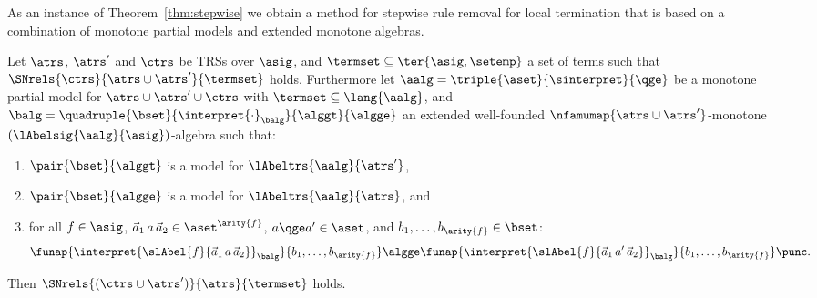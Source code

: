 As an instance of Theorem~\ref{thm:stepwise}
we obtain a method for stepwise rule removal for local termination that is based
on a combination of monotone partial models 
and extended monotone algebras.

\begin{theorem}\label{thm:quasicomb}
  Let $\atrs$, $\atrs'$ and $\ctrs$ 
  be TRSs over $\asig$, and $\termset \subseteq \ter{\asig,\setemp}$ a set of terms such that
  $\SNrels{\ctrs}{\atrs \cup \atrs'}{\termset}$ holds.
  Furthermore let 
  $\aalg = \triple{\aset}{\sinterpret}{{\qge}}$
  be a monotone partial model for $\atrs \cup \atrs' \cup \ctrs$ with $\termset \subseteq \lang{\aalg}$,
  and $\balg = \quadruple{\bset}{\interpret{\cdot}_\balg}{{\alggt}}{{\algge}}$
  an extended well-founded $\nfamumap{\atrs \cup \atrs'}$-monotone $(\lAbelsig{\aalg}{\asig})$-algebra
  such that:
  \begin{enumerate}[\em(1)]
   \item $\pair{\bset}{{\alggt}}$ is a model for $\lAbeltrs{\aalg}{\atrs'}$,
\item $\pair{\bset}{{\algge}}$ is a model for $\lAbeltrs{\aalg}{\atrs}$, and
\item for all $f \in \asig$, $\vec{a}_1\, a\, \vec{a}_2\in \aset^{\arity{f}}$, $a \qge a' \in \aset$, and $b_1,\ldots,b_{\arity{f}} \in \bset$:
        \[\funap{\interpret{\slAbel{f}{\vec{a}_1\, a\, \vec{a}_2}}_\balg}{b_1,\ldots,b_{\arity{f}}}
          \algge
          \funap{\interpret{\slAbel{f}{\vec{a}_1\, a'\, \vec{a}_2}}_\balg}{b_1,\ldots,b_{\arity{f}}}
          \punc.
        \]
  \end{enumerate}
  Then $\SNrels{(\ctrs \cup \atrs')}{\atrs}{\termset}$ holds.
\end{theorem}
